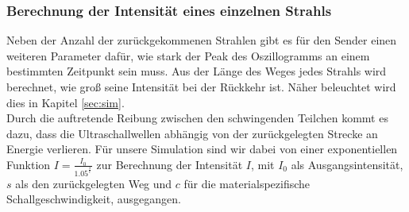 \documentclass[reducespace,stylepage,semiarbeit]{spezidoc}
\begin{document}
\subsubsection{Berechnung der Intensität eines einzelnen Strahls}
Neben der Anzahl der zurückgekommenen Strahlen gibt es für den Sender einen weiteren Parameter dafür, wie stark der Peak des Oszillogramms an einem bestimmten Zeitpunkt sein muss. 
Aus der Länge des Weges jedes Strahls wird berechnet, wie groß seine Intensität bei der Rückkehr ist. 
Näher beleuchtet wird dies in Kapitel \ref{sec:sim}.\\
Durch die auftretende Reibung zwischen den schwingenden Teilchen kommt es dazu, dass die Ultraschallwellen abhängig von der zurückgelegten Strecke an Energie verlieren.
Für unsere Simulation sind wir dabei von einer exponentiellen Funktion $I = \frac{I_0}{1.05^{\tfrac{s}{c}}}$ zur Berechnung der Intensität $I$, mit $I_0$ als Ausgangsintensität, $s$ als den zurückgelegten Weg und $c$ für die materialspezifische Schallgeschwindigkeit, ausgegangen.

\end{document}
